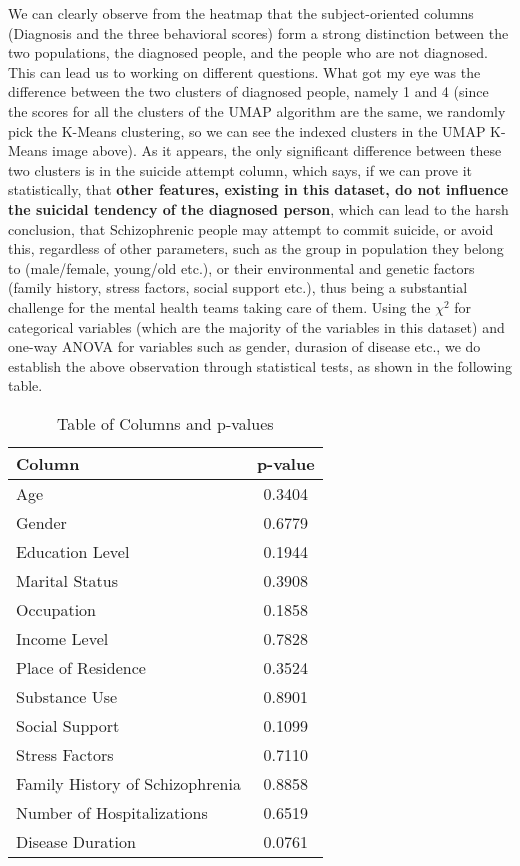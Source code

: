\documentclass{article}
\begin{document}
\begin{figure}[H]
    \centering
\end{figure}

We can clearly observe from the heatmap that the subject-oriented columns (Diagnosis and the three behavioral scores) form a strong distinction between the two populations, the diagnosed people, and the people who are not diagnosed. This can lead us to working on different questions. What got my eye was the difference between the two clusters of diagnosed people, namely 1 and 4 (since the scores for all the clusters of the UMAP algorithm are the same, we randomly pick the K-Means clustering, so we can see the indexed clusters in the UMAP K-Means image above).
As it appears, the only significant difference between these two clusters is in the suicide attempt column, which says, if we can prove it statistically, that \textbf{other features, existing in this dataset, do not influence the suicidal tendency of the diagnosed person}, which can lead to the harsh conclusion, that Schizophrenic people may attempt to commit suicide, or avoid this, regardless of other parameters, such as the group in population they belong to (male/female, young/old etc.), or their environmental and genetic factors (family history, stress factors, social support etc.), thus being a substantial challenge for the mental health teams taking care of them. 
Using the $\chi^2$ for categorical variables (which are the majority of the variables in this dataset) and one-way ANOVA for variables such as gender, durasion of disease etc., we do establish the above observation through statistical tests, as shown in the following table.
\begin{table}[ht]
\centering
\begin{tabular}{|l|c|}
\hline
\textbf{Column} & \textbf{p-value} \\
\hline
Age & 0.3404 \\
Gender & 0.6779 \\
Education Level & 0.1944 \\
Marital Status & 0.3908 \\
Occupation & 0.1858 \\
Income Level & 0.7828 \\
Place of Residence & 0.3524 \\
Substance Use & 0.8901 \\
Social Support & 0.1099 \\
Stress Factors & 0.7110 \\
Family History of Schizophrenia & 0.8858 \\
Number of Hospitalizations & 0.6519 \\
Disease Duration & 0.0761 \\
\hline
\end{tabular}
\caption{Table of Columns and p-values}
\end{table}
\end{document}
